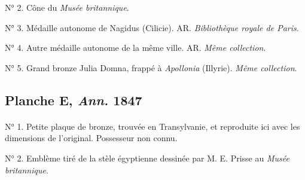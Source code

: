 \documentclass[a4paper, 11pt, oneside, polutonikogreek, french]{article}
\begin{document}
N° 2. Cône du \emph{Musée britannique}.

N° 3. Médaille autonome de Nagidus (Cilicie). AR. \emph{Bibliothèque royale de Paris}.

N° 4. Autre médaille autonome de la même ville. AR. \emph{Même collection}.

N° 5. Grand bronze Julia Domna, frappé à \emph{Apollonia} (Illyrie). \emph{Même collection}.
\clearpage
\subsection{Planche E, \emph{Ann.} 1847}
\paragraph{}
N° 1. Petite plaque de bronze, trouvée en Transylvanie, et reproduite ici avec les dimensions de l'original. Possesseur non connu.

N° 2. Emblème tiré de la stèle égyptienne dessinée par M. E. Prisse au \emph{Musée britannique}.
\clearpage
\end{document}
